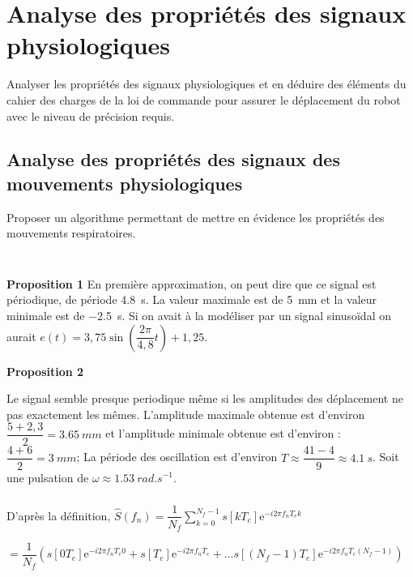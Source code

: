 \documentclass[10pt,fleqn]{article} %
\begin{document}

\vspace{4.5cm}
\pagestyle{fancy}
\thispagestyle{plain}


\def\columnseprulecolor{\color{ocre}}
\setlength{\columnseprule}{0.4pt} 

\section{Analyse des propriétés des signaux physiologiques}

\begin{obj}
Analyser les propriétés des signaux physiologiques et en déduire des éléments du cahier des charges
de la loi de commande pour assurer le déplacement du robot avec le niveau de précision requis.
\end{obj}

\subsection{Analyse des propriétés des signaux des mouvements physiologiques}

\begin{obj}
Proposer un algorithme permettant de mettre en évidence les propriétés des mouvements respiratoires.
\end{obj}
\subparagraph{} ~\\ %
\textbf{Proposition 1}
En première approximation, on peut dire que ce signal est périodique, de période \SI{4,8}{s}. La valeur maximale est de \SI{5}{mm} et la valeur minimale est de \SI{-2,5}{s}.
Si on avait à la modéliser par un signal sinusoïdal on aurait $e(t)=3,75 \sin\left(\dfrac{2\pi}{4,8} t\right) + 1,25$.

\textbf{Proposition 2}

Le signal semble presque periodique même si les amplitudes des déplacement ne pas exactement les mêmes.
L'amplitude maximale obtenue est d'environ $\dfrac{5+2,3}{2}=\SI{3,65}{mm}$ et l'amplitude minimale obtenue est d'environ : $\dfrac{4+6}{2}=\SI{3}{mm}$;
La période des oscillation est d'environ $
T\approx\dfrac{41-4}{9}\approx \SI{4,1}{s}$. 
Soit une pulsation de $\omega\approx \SI{1,53}{rad.s^{-1}}$.

\subparagraph{} %
D'après la définition, 
$\hat{S}\left( f_n\right)= \dfrac{1}{N_f} \sum \limits_{k=0}^{N_f-1} s\left[kT_e\right] \text{e}^{-i 2 \pi f_nT_e k}$

$= \dfrac{1}{N_f} \left(
 s\left[0 T_e\right] \text{e}^{-i 2 \pi f_nT_e 0} + 
 s\left[T_e\right] \text{e}^{-i 2 \pi f_nT_e } + ... 
 s\left[\left( N_f-1\right)T_e\right] \text{e}^{-i 2 \pi f_nT_e \left( N_f-1\right)}\right)$
\end{document}
